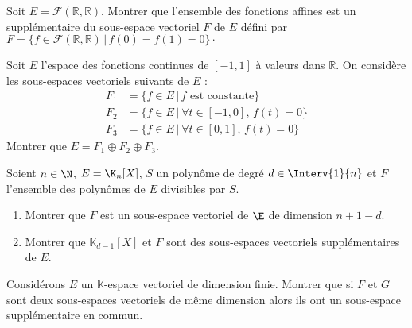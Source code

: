 \documentclass[a4paper,10pt]{report}
\begin{document}
\begin{Exa} Soit $E = \mathcal{F}(\mathbb{R}, \mathbb{R})$. Montrer que l'ensemble des fonctions affines est un supplémentaire du sous-espace vectoriel $F$ de $E$ défini par $F = \lbrace f \in \mathcal{F}(\mathbb{R}, \mathbb{R}) \, \vert \, f(0)=f(1)=0 \rbrace\cdot$
\end{Exa}



\begin{Exa}[\ding{80}] Soit $E$ l'espace des fonctions continues de $[-1,1]$ à valeurs dans $\mathbb{R}$. On considère les sous-espaces vectoriels suivants de $E$ :
\begin{align*}
F_1 &= \lbrace f \in E \, \vert \, f{\text{~est constante}} \rbrace \\
F_2 &= \lbrace f \in E \, \vert \ \forall t \in [ - 1,0], \,  f(t)  = 0 \rbrace \\
F_3 & = \lbrace f \in E \, \vert \ \forall t \in [0,1], \,  f(t) = 0 \rbrace 
\end{align*}
Montrer que $E = F_1 \oplus F_2 \oplus F_3$.
\end{Exa} 



\begin{Exa}[\ding{80}] Soient $n\in\N$, $E=\K_n[X]$, $S$ un polynôme de degré $d \in \Interv{1}{n}$ et $F$ l'ensemble des polynômes de $E$ divisibles par $S$.
\begin{enumerate}
	\item Montrer que $F$ est un sous-espace vectoriel de $\E$ de dimension $n+1-d$.
	\item Montrer que $\mathbb{K}_{d-1}[X]$  et $F$ sont des sous-espaces vectoriels supplémentaires de $E$.
\end{enumerate} 
\end{Exa}


\begin{Exa}[\ding{80}] Considérons $E$ un $\mathbb{K}$-espace vectoriel de dimension finie. Montrer que si $F$ et $G$ sont deux sous-espaces vectoriels de même dimension alors ils ont un sous-espace supplémentaire en commun.
\end{Exa}
\end{document}
